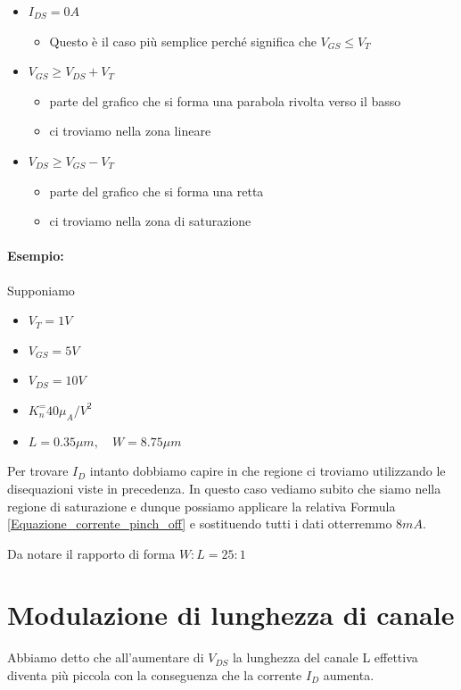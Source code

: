  \begin{itemize}
     \item $I_{DS} = 0A$
     \begin{itemize}
         \item Questo è il caso più semplice perché significa che $V_{GS} \leq V_T$
     \end{itemize}
     
    \item $V_{GS} \geq V_{DS} + V_T$
     \begin{itemize}
         \item parte del grafico che si forma una parabola rivolta verso il basso
         \item ci troviamo nella zona lineare
     \end{itemize}

     \item $ V_{DS} \geq V_{GS} - V_T$
     \begin{itemize}
         \item parte del grafico che si forma una retta
         \item ci troviamo nella zona di saturazione
     \end{itemize}     
 \end{itemize}

\paragraph{Esempio:} Supponiamo 

\begin{itemize}
    \item $V_T = 1V$
    \item $V_{GS} = 5V$
    \item $V_{DS} = 10V$
    \item $K_{n}^ = 40 \mu_A/V^2$
    \item $L = 0.35 \mu m, \quad W = 8.75 \mu m$
\end{itemize}

Per trovare \textbf{$I_D$} intanto dobbiamo capire in che regione ci troviamo utilizzando le disequazioni viste in precedenza.
In questo caso vediamo subito che siamo nella regione di saturazione e dunque possiamo applicare la relativa Formula \ref{Equazione_corrente_pinch_off} e sostituendo tutti i dati otterremmo $8 mA$.

 Da notare il rapporto di forma $W:L = 25:1$


\section{Modulazione di lunghezza di canale}
Abbiamo detto che all'aumentare di $V_{DS}$ la lunghezza del canale L effettiva diventa più piccola con la conseguenza che la corrente $I_D$ aumenta.

